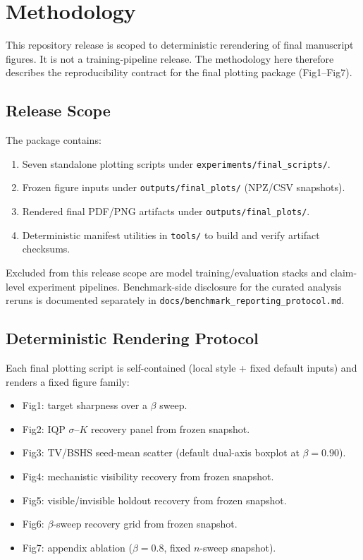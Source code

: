 \section{Methodology}
\label{sec:methodology}

This repository release is scoped to deterministic rerendering of final manuscript figures.
It is not a training-pipeline release.
The methodology here therefore describes the reproducibility contract for the final plotting package (Fig1--Fig7).

\subsection{Release Scope}
The package contains:
\begin{enumerate}
\item Seven standalone plotting scripts under \texttt{experiments/final\_scripts/}.
\item Frozen figure inputs under \texttt{outputs/final\_plots/} (NPZ/CSV snapshots).
\item Rendered final PDF/PNG artifacts under \texttt{outputs/final\_plots/}.
\item Deterministic manifest utilities in \texttt{tools/} to build and verify artifact checksums.
\end{enumerate}

Excluded from this release scope are model training/evaluation stacks and claim-level experiment pipelines.
Benchmark-side disclosure for the curated analysis reruns is documented separately in
\texttt{docs/benchmark\_reporting\_protocol.md}.

\subsection{Deterministic Rendering Protocol}
Each final plotting script is self-contained (local style + fixed default inputs) and renders a fixed figure family:
\begin{itemize}
\item Fig1: target sharpness over a $\beta$ sweep.
\item Fig2: IQP $\sigma$--$K$ recovery panel from frozen snapshot.
\item Fig3: TV/BSHS seed-mean scatter (default dual-axis boxplot at $\beta=0.90$).
\item Fig4: mechanistic visibility recovery from frozen snapshot.
\item Fig5: visible/invisible holdout recovery from frozen snapshot.
\item Fig6: $\beta$-sweep recovery grid from frozen snapshot.
\item Fig7: appendix ablation ($\beta=0.8$, fixed $n$-sweep snapshot).
\end{itemize}

